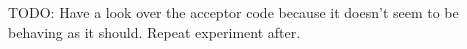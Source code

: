 {\color{red}TODO: Have a look over the acceptor code because it doesn't seem to be behaving as it should. Repeat experiment after.}

%



